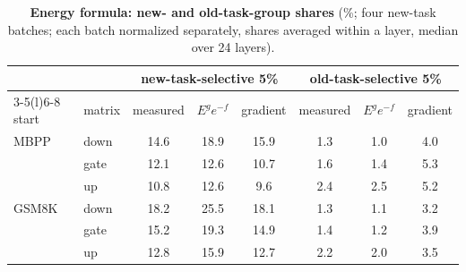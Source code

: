 \begin{table}[tbp]
\centering\small
\caption{\textbf{Energy formula: new- and old-task-group shares} (\%; four new-task batches; each batch normalized
separately, shares averaged within a layer, median over 24 layers).}
\label{tab:formulanew}
\setlength{\tabcolsep}{4pt}
\begin{tabular}{@{}llcccccc@{}}
\toprule
& & \multicolumn{3}{c}{new-task-selective 5\%} & \multicolumn{3}{c}{old-task-selective 5\%} \\
\cmidrule(lr){3-5}\cmidrule(l){6-8}
start & matrix & measured & $E^g e^{-f}$ & gradient & measured & $E^g e^{-f}$ & gradient \\
\midrule
MBPP & down & 14.6 & 18.9 & 15.9 & 1.3 & 1.0 & 4.0 \\
 & gate & 12.1 & 12.6 & 10.7 & 1.6 & 1.4 & 5.3 \\
 & up & 10.8 & 12.6 & \phantom{0}9.6 & 2.4 & 2.5 & 5.2 \\
\addlinespace[3pt]
GSM8K & down & 18.2 & 25.5 & 18.1 & 1.3 & 1.1 & 3.2 \\
 & gate & 15.2 & 19.3 & 14.9 & 1.4 & 1.2 & 3.9 \\
 & up & 12.8 & 15.9 & 12.7 & 2.2 & 2.0 & 3.5 \\
\bottomrule
\end{tabular}
\end{table}
